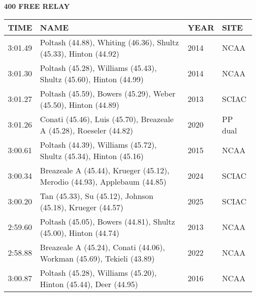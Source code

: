 \begin{center}
\begin{minipage}[t]{0.7\textwidth}
\centering
\textbf{400 FREE RELAY}\\[0.05cm]
\begin{tabular}{@{}p{1.8cm}p{2.8cm}p{1.2cm}p{1.4cm}@{}}
\hline
\textbf{TIME} & \textbf{NAME} & \textbf{YEAR} & \textbf{SITE} \\
\hline
3:01.49 & Poltash (44.88), Whiting (46.36), Shultz (45.33), Hinton (44.92) & 2014 & NCAA \\
3:01.30 & Poltash (45.28), Williams (45.43), Shultz (45.60), Hinton (44.99) & 2014 & NCAA \\
3:01.27 & Poltash (45.59), Bowers (45.29), Weber (45.50), Hinton (44.89) & 2013 & SCIAC \\
3:01.26 & Conati (45.46), Luis (45.70), Breazeale A (45.28), Roeseler (44.82) & 2020 & PP dual \\
3:00.61 & Poltash (44.39), Williams (45.72), Shultz (45.34), Hinton (45.16) & 2015 & NCAA \\
3:00.34 & Breazeale A (45.44), Krueger (45.12), Merodio (44.93), Applebaum (44.85) & 2024 & SCIAC \\
3:00.20 & Tan (45.33), Su (45.12), Johnson (45.18), Krueger (44.57) & 2025 & SCIAC \\
2:59.60 & Poltash (45.05), Bowers (44.81), Shultz (45.00), Hinton (44.74) & 2013 & NCAA \\
2:58.88 & Breazeale A (45.24), Conati (44.06), Workman (45.69), Tekieli (43.89) & 2022 & NCAA \\
3:00.87 & Poltash (45.28), Williams (45.20), Hinton (45.44), Deer (44.95) & 2016 & NCAA \\
\hline
\end{tabular}
\end{minipage}
\end{center}

\vspace{0.4cm}

